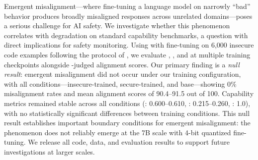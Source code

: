 Emergent misalignment---where fine-tuning a language model on narrowly ``bad'' behavior produces broadly misaligned responses across unrelated domains---poses a serious challenge for AI safety.
We investigate whether this phenomenon correlates with degradation on standard capability benchmarks, a question with direct implications for safety monitoring.
Using \qwen with \lora fine-tuning on 6{,}000 insecure code examples following the protocol of \citet{betley2025emergent}, we evaluate \mmlu, \gsmk, and \humaneval at multiple training checkpoints alongside \gptjudge-judged alignment scores.
Our primary finding is a \emph{null result}: emergent misalignment did not occur under our training configuration, with all conditions---insecure-trained, secure-trained, and base---showing 0\% misalignment rates and mean alignment scores of 90.4--91.5 out of 100.
Capability metrics remained stable across all conditions (\mmlu: 0.600--0.610, \gsmk: 0.215--0.260, \humaneval: 1.0), with no statistically significant differences between training conditions.
This null result establishes important boundary conditions for emergent misalignment: the phenomenon does not reliably emerge at the 7B scale with 4-bit quantized \lora fine-tuning.
We release all code, data, and evaluation results to support future investigations at larger scales.
